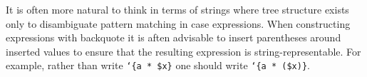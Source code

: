 \documentclass{article}
\begin{document}
It is often more natural to think in terms of strings where tree structure exists only to disambiguate
pattern matching in case expressions.  When constructing expressions with backquote it is aften advisable to insert
parentheses around inserted values to ensure that the resulting expression is string-representable.  For example,
rather than write {\tt `\{a * \$x\}} one should write {\tt `\{a * (\$x)\}}.
\end{document}

